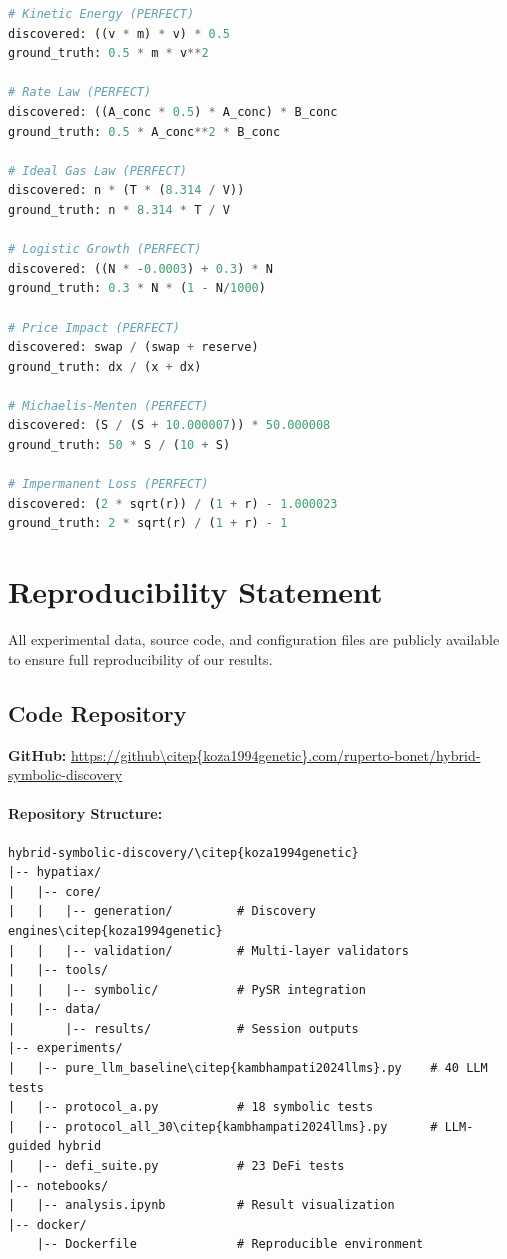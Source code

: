 \documentclass[twoside,11pt]{article}
\begin{document}
\begin{lstlisting}[caption=Discovered Symbolic Expressions, label=lst:discovered, language=Python]
# Kinetic Energy (PERFECT)
discovered: ((v * m) * v) * 0.5
ground_truth: 0.5 * m * v**2

# Rate Law (PERFECT)
discovered: ((A_conc * 0.5) * A_conc) * B_conc
ground_truth: 0.5 * A_conc**2 * B_conc

# Ideal Gas Law (PERFECT)
discovered: n * (T * (8.314 / V))
ground_truth: n * 8.314 * T / V

# Logistic Growth (PERFECT)
discovered: ((N * -0.0003) + 0.3) * N
ground_truth: 0.3 * N * (1 - N/1000)

# Price Impact (PERFECT)
discovered: swap / (swap + reserve)
ground_truth: dx / (x + dx)

# Michaelis-Menten (PERFECT)
discovered: (S / (S + 10.000007)) * 50.000008
ground_truth: 50 * S / (10 + S)

# Impermanent Loss (PERFECT)
discovered: (2 * sqrt(r)) / (1 + r) - 1.000023
ground_truth: 2 * sqrt(r) / (1 + r) - 1
\end{lstlisting}


\section{Reproducibility Statement}
\label{app:reproducibility}

All experimental data, source code, and configuration files are publicly available to ensure full reproducibility of our results.

\subsection{Code Repository}

\textbf{GitHub:} \url{https://github\citep{koza1994genetic}.com/ruperto-bonet/hybrid-symbolic-discovery}

\paragraph{Repository Structure:}
\begin{small}
\begin{verbatim}
hybrid-symbolic-discovery/\citep{koza1994genetic}
|-- hypatiax/
|   |-- core/
|   |   |-- generation/         # Discovery engines\citep{koza1994genetic}
|   |   |-- validation/         # Multi-layer validators
|   |-- tools/
|   |   |-- symbolic/           # PySR integration
|   |-- data/
|       |-- results/            # Session outputs
|-- experiments/
|   |-- pure_llm_baseline\citep{kambhampati2024llms}.py    # 40 LLM tests
|   |-- protocol_a.py           # 18 symbolic tests
|   |-- protocol_all_30\citep{kambhampati2024llms}.py      # LLM-guided hybrid
|   |-- defi_suite.py           # 23 DeFi tests
|-- notebooks/
|   |-- analysis.ipynb          # Result visualization
|-- docker/
    |-- Dockerfile              # Reproducible environment
\end{verbatim}
\end{small}
\end{document}
